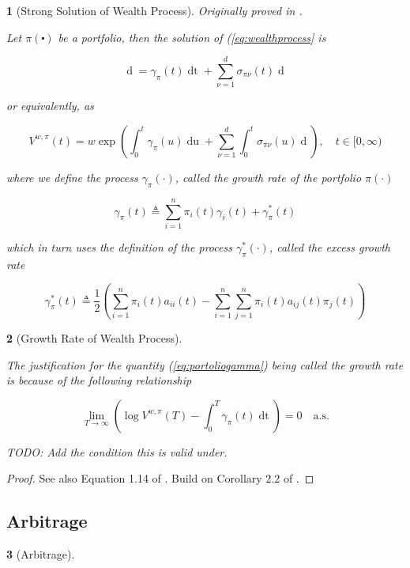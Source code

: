\documentclass[british]{amsart}
\numberwithin{equation}{section}
\numberwithin{figure}{section}
\theoremstyle{plain}
\newtheorem{thm}{\protect\theoremname}[section]
\theoremstyle{definition}
\newtheorem{defn}[thm]{\protect\definitionname}
\theoremstyle{plain}
\theoremstyle{plain}
\theoremstyle{plain}
\newtheorem{prop}[thm]{\protect\propositionname}
\theoremstyle{remark}
\theoremstyle{plain}
\providecommand{\definitionname}{Definition}
\providecommand{\propositionname}{Proposition}
\providecommand{\theoremname}{Theorem}
\renewcommand{\d}[1]{\mathop{\mathrm{d}{#1}}}
\newcommand{\ranget}{t\in[0,\infty)}
\newcommand{\defeq}{\mathop{\triangleq}}
\newcommand{\almostsurely}{\text{a.s.}}
\begin{document}
\begin{prop} [Strong Solution of Wealth Process]

	Originally proved in \cite{fernholz1999}. 

	Let $\pi(\centerdot)$ be a portfolio, then the solution of (\ref{eq:wealthprocess} is

	\begin{equation}
		\d{V^{w,\pi}(t)} =  
				\gamma_{\pi}(t) \d{t} +
				\sum_{\nu=1}^{d} \sigma_{\pi\nu}(t) \d{W_{\nu}(t)}
	\end{equation}

	or equivalently, as

	\begin{equation}
		V^{w,\pi}(t) = w \exp{ 
			\left(
				\int_{0}^{t} \gamma_{\pi}(u) \d{u} +
				\sum_{\nu=1}^{d} \int_{0}^{t} \sigma_{\pi\nu}(u) \d{W_{\nu}(u)}
			\right)},
	\quad \ranget
	\end{equation}

	where we define the process $\gamma_{\pi}(\cdot)$, called the \textit{growth rate} of the 
	portfolio $\pi(\cdot)$

	\begin{equation}
		\label{eq:portfoliogamma}
		\gamma_{\pi}(t) \defeq \sum_{i=1}^{n} \pi_{i}(t)\gamma_{i}(t) + \gamma_{\pi}^{*}(t)
	\end{equation}

	which in turn uses the definition of the process $\gamma_{\pi}^{*}(\cdot)$, called the
	\textit{excess growth rate}

	\begin{equation}
		\gamma_{\pi}^{*}(t) \defeq \frac{1}{2} 
				\left(
					\sum_{i=1}^{n} \pi_{i}(t)a_{ii}(t) -
					\sum_{i=1}^{n} \sum_{j=1}^{n} \pi_{i}(t)a_{ij}(t)\pi_{j}(t)
				\right)
	\end{equation}

\end{prop}

\begin{thm} [Growth Rate of Wealth Process]
	\label{thm:wealthgrowthrate}

	The justification for the quantity (\ref{eq:portoliogamma}) being called the 
	\textit{growth rate} is	because of the following relationship

	\begin{equation}
		\lim_{T \to \infty} 
			\left( 
			\log{V^{w,\pi}(T)} - \int_{0}^{T} \gamma_{\pi}(t)\d{t} 
			\right) = 0
		\quad \almostsurely
	\end{equation}

	TODO: Add the condition this is valid under.

\end{thm}

\begin{proof}
	See also Equation 1.14 of \cite{fernholz2009}.
	Build on Corollary 2.2 of \cite{fernholz1999}.
\end{proof}




\subsection{Arbitrage}

\begin{defn} [Arbitrage]
	\label{def:portfolio}
\end{defn}



\printbibliography
\end{document}
